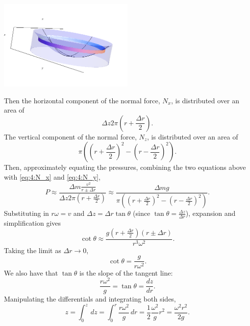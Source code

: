 \documentclass{esg8012exam}
\begin{document}
\begin{solution}
    \begin{center}\includegraphics[width=0.5\textwidth]{exam1_s4_4.png}\end{center}
    Then the horizontal component of the normal force, $N_x$, is distributed over an area of
    \begin{equation}
      \Delta z 2 \pi\left(r + \frac{\Delta r}{2}\right).
    \end{equation}
    The vertical component of the normal force, $N_z$, is distributed over an area of
    \begin{equation}
      \pi \left( \left(r + \frac{\Delta r}{2}\right)^2 - \left(r - \frac{\Delta r}{2}\right)^2\right).
    \end{equation}
    Then, approximately equating the pressures, combining the two equations above with \autoref{eq:4:N_x} and \autoref{eq:4:N_y},
    \begin{equation}
      P \approx \frac{\Delta m \frac{v^2}{r \pm \Delta r}}{\Delta z 2 \pi\left(r + \frac{\Delta r}{2}\right)} \approx \frac{\Delta m g}{\pi \left( \left(r + \frac{\Delta r}{2}\right)^2 - \left(r - \frac{\Delta r}{2}\right)^2\right)}.
    \end{equation}
    Substituting in $r \omega = v$ and $\Delta z = \Delta r \tan\theta$ (since $\tan\theta = \frac{\Delta z}{\Delta r}$), expansion and simplification gives
    \begin{equation}
      \cot \theta \approx \frac{g \left(r+\frac{\Delta r}{2}\right) (r\pm \Delta r)}{r^3 \omega^2}.
    \end{equation}
    Taking the limit as $\Delta r \to 0$,
    \begin{equation}
      \cot \theta = \frac{g}{r \omega^2}.
    \end{equation}
    We also have that $\tan\theta$ is the slope of the tangent line:
    $$\frac{r\omega^2}{g} = \tan\theta = \frac{dz}{dr}.$$
    Manipulating the differentials and integrating both sides,
    $$z = \int_0^z\,dz = \int_0^r \frac{r\omega^2}{g}\,dr = \frac{1}{2}\frac{\omega^2}{g}r^2 = \frac{\omega^2 r^2}{2g}.$$

\end{solution}
\end{document}
